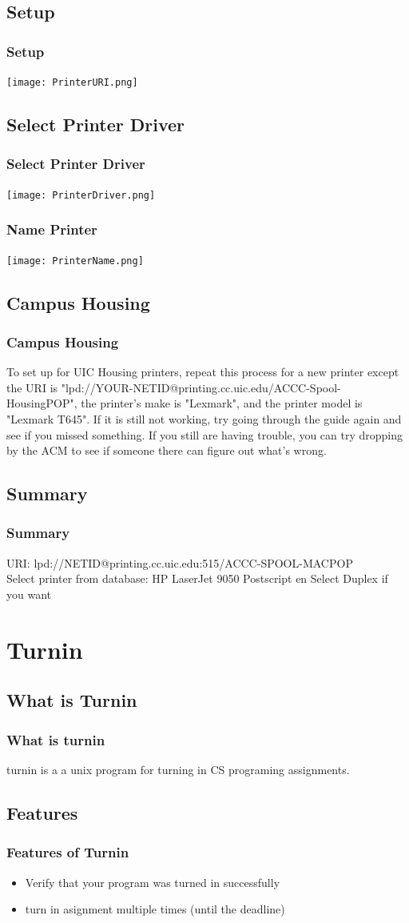 \documentclass[hyperref={pdfpagelabels=false}]{beamer}
\begin{document}
\subsection{Setup}
\frame
{
    \frametitle{Setup}
     \texttt{[image: PrinterURI.png]}
}
\subsection{Select Printer Driver}
\frame
{
    \frametitle{Select Printer Driver}
     \texttt{[image: PrinterDriver.png]}
}
\frame
{
    \frametitle{Name Printer}
     \texttt{[image: PrinterName.png]}

}
\subsection{Campus Housing}
\frame
{
	\frametitle{Campus Housing}
	To set up for UIC Housing printers, repeat this process for a new printer except the URI is "lpd://YOUR-NETID@printing.cc.uic.edu/ACCC-Spool-HousingPOP", the printer's make is "Lexmark", and the printer model is "Lexmark T645". If it is still not working, try going through the guide again and see if you missed something. If you still are having trouble, you can try dropping by the ACM to see if someone there can figure out what's wrong. 
}
\subsection{Summary}
\frame
{
    \frametitle{Summary}
URI: lpd://NETID@printing.cc.uic.edu:515/ACCC-SPOOL-MACPOP\\
Select printer from database: HP LaserJet 9050 Postscript en
Select Duplex if you want


}
\section{Turnin}
\subsection{What is Turnin}
\frame
{
    \frametitle{What is turnin}
    turnin is a a unix program for turning in CS programing assignments.
}

\subsection{Features}
\frame
{
    \frametitle{Features of Turnin}
    \begin{itemize}
    \item{Verify that your program was turned in successfully}
    \item{turn in asignment multiple times (until the deadline)}
    \end{itemize}
}
\end{document}
